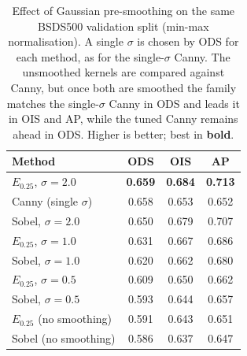 \documentclass[conference]{IEEEtran}
\begin{document}
\begin{table}[!t]
\centering
\footnotesize
\caption{Effect of Gaussian pre-smoothing on the same BSDS500 validation split
(min-max normalisation).  A single $\sigma$ is chosen by ODS for each method, as for
the single-$\sigma$ Canny.  The unsmoothed kernels are compared against Canny, but
once both are smoothed the family matches the single-$\sigma$ Canny in ODS and leads
it in OIS and AP, while the tuned Canny remains ahead in ODS.
Higher is better; best in \textbf{bold}.}
\label{tab:bsds_smooth}
\begin{tabular}{@{}lccc@{}}
\toprule
Method & ODS & OIS & AP \\
\midrule
$E_{0.25}$, $\sigma=2.0$    & \textbf{0.659} & \textbf{0.684} & \textbf{0.713} \\
Canny (single $\sigma$)     & 0.658 & 0.653 & 0.652 \\
Sobel, $\sigma=2.0$         & 0.650 & 0.679 & 0.707 \\
$E_{0.25}$, $\sigma=1.0$    & 0.631 & 0.667 & 0.686 \\
Sobel, $\sigma=1.0$         & 0.620 & 0.662 & 0.680 \\
$E_{0.25}$, $\sigma=0.5$    & 0.609 & 0.650 & 0.662 \\
Sobel, $\sigma=0.5$          & 0.593 & 0.644 & 0.657 \\
$E_{0.25}$ (no smoothing)   & 0.591 & 0.643 & 0.651 \\
Sobel (no smoothing)        & 0.586 & 0.637 & 0.647 \\
\bottomrule
\end{tabular}
\end{table}
\end{document}
